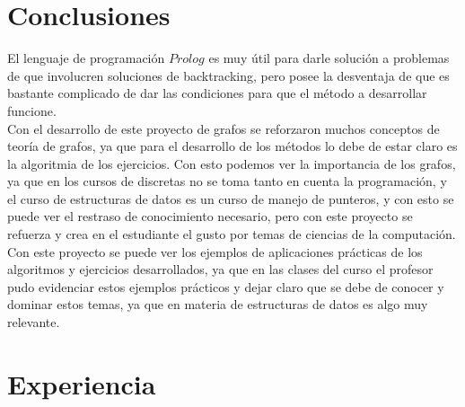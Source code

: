 \documentclass[10pt,a4paper]{article}
\begin{document}
\section{Conclusiones}
El lenguaje de programación $Prolog$ es muy útil para darle solución a problemas de que involucren soluciones de backtracking, pero posee la desventaja de que es bastante complicado de dar las condiciones para que el método a desarrollar funcione.\\

Con el desarrollo de este proyecto de grafos se reforzaron muchos conceptos de teoría de grafos, ya que para el desarrollo de los métodos lo debe de estar claro es la algoritmia de los ejercicios. Con esto podemos ver la importancia de los grafos, ya que en los cursos de discretas no se toma tanto en cuenta la programación, y el curso de estructuras de datos es un curso de manejo de punteros, y con esto se puede ver el restraso de conocimiento necesario, pero con este proyecto se refuerza y crea en el estudiante el gusto por temas de ciencias de la computación.\\

Con este proyecto se puede ver los ejemplos de aplicaciones prácticas de los algoritmos y ejercicios desarrollados, ya que en las clases del curso el profesor pudo evidenciar estos ejemplos prácticos y dejar claro que se debe de conocer y dominar estos temas, ya que en materia de estructuras de datos es algo muy relevante.\\
\section{Experiencia}

\pagebreak


\end{document}
